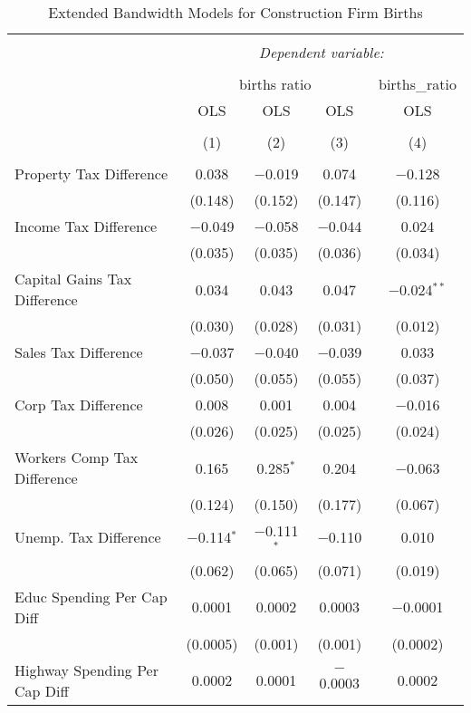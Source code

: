 
\begin{table}[!htbp] \centering 
  \caption{Extended Bandwidth Models for  Construction Firm Births} 
  \label{23eb} 
\begin{tabular}{@{\extracolsep{5pt}}lcccc} 
\\[-1.8ex]\hline 
\hline \\[-1.8ex] 
 & \multicolumn{4}{c}{\textit{Dependent variable:}} \\ 
\cline{2-5} 
\\[-1.8ex] & \multicolumn{3}{c}{births ratio} & births\_ratio \\ 
 & OLS & OLS & OLS & OLS \\ 
\\[-1.8ex] & (1) & (2) & (3) & (4)\\ 
\hline \\[-1.8ex] 
 Property Tax Difference & 0.038 & $-$0.019 & 0.074 & $-$0.128 \\ 
  & (0.148) & (0.152) & (0.147) & (0.116) \\ 
  Income Tax Difference & $-$0.049 & $-$0.058 & $-$0.044 & 0.024 \\ 
  & (0.035) & (0.035) & (0.036) & (0.034) \\ 
  Capital Gains Tax Difference & 0.034 & 0.043 & 0.047 & $-$0.024$^{**}$ \\ 
  & (0.030) & (0.028) & (0.031) & (0.012) \\ 
  Sales Tax Difference & $-$0.037 & $-$0.040 & $-$0.039 & 0.033 \\ 
  & (0.050) & (0.055) & (0.055) & (0.037) \\ 
  Corp Tax Difference & 0.008 & 0.001 & 0.004 & $-$0.016 \\ 
  & (0.026) & (0.025) & (0.025) & (0.024) \\ 
  Workers Comp Tax Difference & 0.165 & 0.285$^{*}$ & 0.204 & $-$0.063 \\ 
  & (0.124) & (0.150) & (0.177) & (0.067) \\ 
  Unemp. Tax Difference & $-$0.114$^{*}$ & $-$0.111$^{*}$ & $-$0.110 & 0.010 \\ 
  & (0.062) & (0.065) & (0.071) & (0.019) \\ 
  Educ Spending Per Cap Diff & 0.0001 & 0.0002 & 0.0003 & $-$0.0001 \\ 
  & (0.0005) & (0.001) & (0.001) & (0.0002) \\ 
  Highway Spending Per Cap Diff & 0.0002 & 0.0001 & $-$0.0003 & 0.0002 \\ 

\end{tabular}
\end{table}
